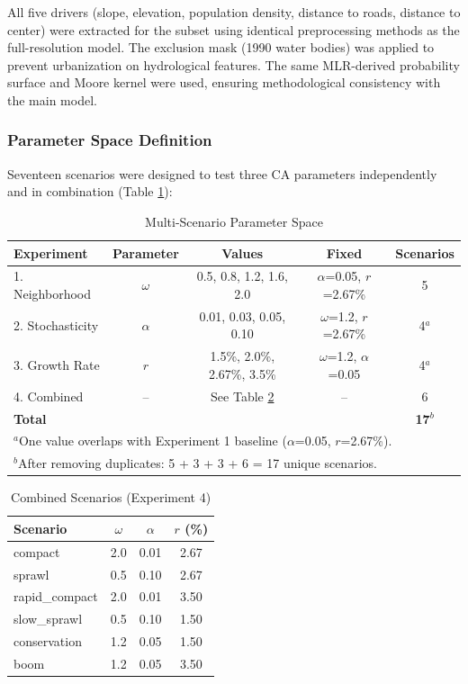 \documentclass[12pt,a4paper]{article}
\begin{document}
All five drivers (slope, elevation, population density, distance to roads, distance to center) were extracted for the subset using identical preprocessing methods as the full-resolution model. The exclusion mask (1990 water bodies) was applied to prevent urbanization on hydrological features. The same MLR-derived probability surface and Moore kernel were used, ensuring methodological consistency with the main model.

\subsubsection{Parameter Space Definition}

Seventeen scenarios were designed to test three CA parameters independently and in combination (Table \ref{tab:scenarios}):

\begin{table}[H]
\caption{Multi-Scenario Parameter Space}
\label{tab:scenarios}
\centering
\small
\renewcommand{\arraystretch}{1.2}
\begin{tabular}{lcccc}
\toprule
\textbf{Experiment} & \textbf{Parameter} & \textbf{Values} & \textbf{Fixed} & \textbf{Scenarios} \\
\midrule
1. Neighborhood & $\omega$ & 0.5, 0.8, 1.2, 1.6, 2.0 & $\alpha$=0.05, $r$=2.67\% & 5 \\
2. Stochasticity & $\alpha$ & 0.01, 0.03, 0.05, 0.10 & $\omega$=1.2, $r$=2.67\% & 4$^a$ \\
3. Growth Rate & $r$ & 1.5\%, 2.0\%, 2.67\%, 3.5\% & $\omega$=1.2, $\alpha$=0.05 & 4$^a$ \\
4. Combined & -- & See Table \ref{tab:combined} & -- & 6 \\
\midrule
\textbf{Total} & & & & \textbf{17}$^b$ \\
\bottomrule
\multicolumn{5}{l}{\scriptsize $^a$One value overlaps with Experiment 1 baseline ($\alpha$=0.05, $r$=2.67\%).}\\
\multicolumn{5}{l}{\scriptsize $^b$After removing duplicates: 5 + 3 + 3 + 6 = 17 unique scenarios.}
\end{tabular}
\end{table}

\begin{table}[H]
\caption{Combined Scenarios (Experiment 4)}
\label{tab:combined}
\centering
\small
\renewcommand{\arraystretch}{1.2}
\begin{tabular}{lccc}
\toprule
\textbf{Scenario} & \textbf{$\omega$} & \textbf{$\alpha$} & \textbf{$r$ (\%)} \\
\midrule
compact & 2.0 & 0.01 & 2.67 \\
sprawl & 0.5 & 0.10 & 2.67 \\
rapid\_compact & 2.0 & 0.01 & 3.50 \\
slow\_sprawl & 0.5 & 0.10 & 1.50 \\
conservation & 1.2 & 0.05 & 1.50 \\
boom & 1.2 & 0.05 & 3.50 \\
\bottomrule
\end{tabular}
\end{table}
\end{document}
